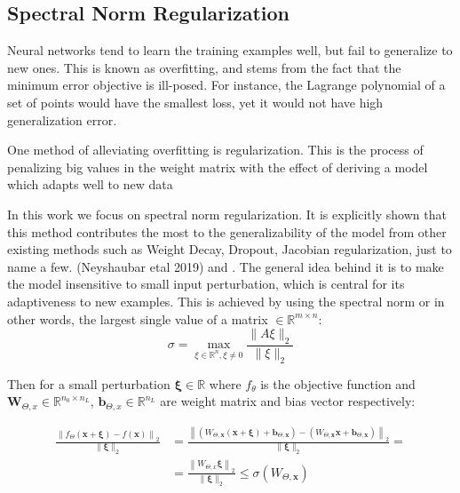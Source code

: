 \documentclass{article}
\begin{document}
    \subsection{Spectral Norm Regularization}

Neural networks tend to learn the training examples well, but fail to generalize to new ones. This is known as overfitting, and stems from the fact that the minimum error objective is ill-posed. For instance, the Lagrange polynomial of a set of points would have the smallest loss, yet it would not have high generalization error.

One method of alleviating overfitting is regularization. This is the process of penalizing big values in the weight matrix with the effect of deriving a model which adapts well to new data
  
In this work we focus on spectral norm regularization\cite{spectral}. 
It is explicitly shown that this method contributes the most to the generalizability of the model from other existing methods such as Weight Decay, Dropout, Jacobian regularization, just to name a few. (Neyshaubar etal 2019)\cite{Neyshaubar} and \cite{Arora}. The general idea behind it is to make the model insensitive to small input perturbation, which is central for its adaptiveness to new examples. This is achieved by using the spectral norm or in other words, the largest single value of a matrix  $ \in \mathbb{R}^ {m\times n} $:
$$\sigma = \max_{\xi \in \mathbb{R}^ {n}, \xi \neq 0}\dfrac{ \|A\xi\|_2}{\|\xi\|_2}$$

Then for a small perturbation $\boldsymbol{\xi} \in \mathbb{R}$ where $f_\theta$ is the objective function and $\boldsymbol{W}_{\Theta,x} \in \mathbb{R}^{n_0\times n_L}$, $\boldsymbol{b}_{\Theta, x} \in \mathbb{R}^{n_L}$ are weight matrix and bias vector respectively:

\begin{equation*}
    \begin{split}
        \frac{\left\|f_{\Theta}(\boldsymbol{x}+\boldsymbol{\xi})-f(\boldsymbol{x})\right\|_{2}}{\|\boldsymbol{\xi}\|_{2}}&=\frac{\left\|\left(W_{\Theta, \boldsymbol{x}}(\boldsymbol{x}+\boldsymbol{\xi})+\boldsymbol{b}_{\Theta, \boldsymbol{x}}\right)-\left(W_{\Theta, \boldsymbol{x}} \boldsymbol{x}+\boldsymbol{b}_{\Theta, \boldsymbol{x}}\right)\right\|_{2}}{\|\boldsymbol{\xi}\|_{2}}=\\
        &=\frac{\left\|W_{\Theta, x} \boldsymbol{\xi}\right\|_{2}}{\|\boldsymbol{\xi}\|_{2}} \leq \sigma\left(W_{\Theta, \boldsymbol{x}}\right)
    \end{split}
\end{equation*}
\end{document}
